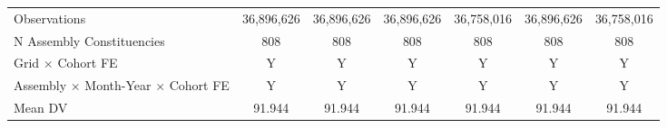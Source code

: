 \begin{tabular}{lcccccc}
\hline
Observations&  36,896,626         &  36,896,626         &  36,896,626         &  36,758,016         &  36,896,626         &  36,758,016         \\
N Assembly Constituencies&         808         &         808         &         808         &         808         &         808         &         808         \\
Grid $\times$ Cohort FE&           Y         &           Y         &           Y         &           Y         &           Y         &           Y         \\
Assembly $\times$ Month-Year $\times$ Cohort FE&           Y         &           Y         &           Y         &           Y         &           Y         &           Y         \\
Mean DV     &      91.944         &      91.944         &      91.944         &      91.944         &      91.944         &      91.944         \\
\hline
\end{tabular}
